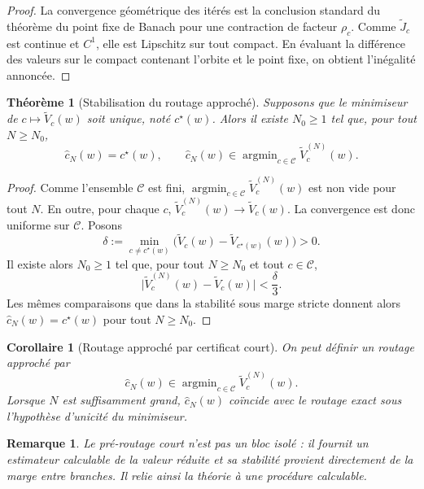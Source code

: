 \documentclass[11pt,a4paper]{article}
\newtheorem{theorem}{Théorème}[section]
\newtheorem{corollary}{Corollaire}[section]
\newtheorem{remark}{Remarque}[section]
\DeclareMathOperator{\argmin}{argmin}
\newcommand{\Ccal}{\mathcal C}
\begin{document}
\begin{proof}
La convergence géométrique des itérés est la conclusion standard du théorème du point fixe de Banach pour une contraction de facteur \(\rho_c\). Comme \(\widetilde J_c\) est continue et \(C^1\), elle est Lipschitz sur tout compact. En évaluant la différence des valeurs sur le compact contenant l'orbite et le point fixe, on obtient l'inégalité annoncée.
\end{proof}

\begin{theorem}[Stabilisation du routage approché]
Supposons que le minimiseur de \(c\mapsto \widetilde V_c(w)\) soit unique, noté \(c^\star(w)\). Alors il existe \(N_0\ge 1\) tel que, pour tout \(N\ge N_0\),
\[
\hat c_N(w)=c^\star(w),
\qquad
\hat c_N(w)\in\argmin_{c\in\Ccal}\widetilde V_c^{(N)}(w).
\]
\end{theorem}

\begin{proof}
Comme l'ensemble \(\Ccal\) est fini, \(\argmin_{c\in\Ccal}\widetilde V_c^{(N)}(w)\) est non vide pour tout \(N\). En outre, pour chaque \(c\), \(\widetilde V_c^{(N)}(w)\to \widetilde V_c(w)\). La convergence est donc uniforme sur \(\Ccal\). Posons
\[
\delta:=\min_{c\neq c^\star(w)}\bigl(\widetilde V_c(w)-\widetilde V_{c^\star(w)}(w)\bigr)>0.
\]
Il existe alors \(N_0\ge 1\) tel que, pour tout \(N\ge N_0\) et tout \(c\in\Ccal\),
\[
\bigl|\widetilde V_c^{(N)}(w)-\widetilde V_c(w)\bigr|<\frac{\delta}{3}.
\]
Les mêmes comparaisons que dans la stabilité sous marge stricte donnent alors \(\hat c_N(w)=c^\star(w)\) pour tout \(N\ge N_0\).
\end{proof}

\begin{corollary}[Routage approché par certificat court]
On peut définir un routage approché par
\[
\hat c_N(w)\in\argmin_{c\in\Ccal}\widetilde V_c^{(N)}(w).
\]
Lorsque \(N\) est suffisamment grand, \(\hat c_N(w)\) coïncide avec le routage exact sous l'hypothèse d'unicité du minimiseur.
\end{corollary}

\begin{remark}
Le pré-routage court n'est pas un bloc isolé : il fournit un estimateur calculable de la valeur réduite et sa stabilité provient directement de la marge entre branches. Il relie ainsi la théorie à une procédure calculable.
\end{remark}
\end{document}
